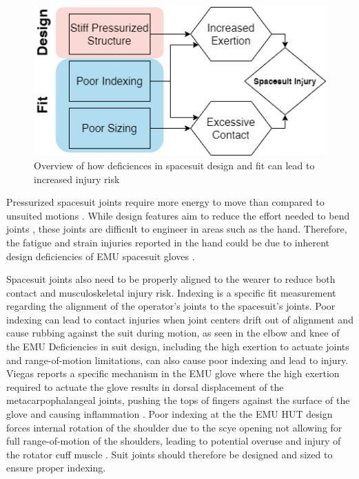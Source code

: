 \documentclass[defaultstyle,11pt]{comps}
\begin{document}
\begin{figure}
\hypertarget{fig:B-fitflow}{%
\centering
\includegraphics{../fig/Background/fitflow.PNG}
\caption{Overview of how deficiences in spacesuit design and fit can lead to increased injury risk}\label{fig:B-fitflow}
}
\end{figure}

Pressurized spacesuit joints require more energy to move than compared to unsuited motions \citep{Newman1997, Amick2015}.
While design features aim to reduce the effort needed to bend joints \citep{Harris2001}, these joints are difficult to engineer in areas such as the hand.
Therefore, the fatigue and strain injuries reported in the hand could be due to inherent design deficiencies of EMU spacesuit gloves \citep{Strauss2004, Viegas2004}.

Spacesuit joints also need to be properly aligned to the wearer to reduce both contact and musculoskeletal injury risk.
Indexing is a specific fit measurement regarding the alignment of the operator's joints to the spacesuit's joints.
Poor indexing can lead to contact injuries when joint centers drift out of alignment and cause rubbing against the suit during motion, as seen in the elbow and knee of the EMU \citep{Strauss2004}
Deficiencies in suit design, including the high exertion to actuate joints and range-of-motion limitations, can also cause poor indexing and lead to injury.
Viegas reports a specific mechanism in the EMU glove where the high exertion required to actuate the glove results in dorsal displacement of the metacarpophalangeal joints, pushing the tops of fingers against the surface of the glove and causing inflammation \citep{Viegas2004}.
Poor indexing at the the EMU HUT design forces internal rotation of the shoulder due to the scye opening not allowing for full range-of-motion of the shoulders, leading to potential overuse and injury of the rotator cuff muscle \citep{Williams2003, Strauss2004, Strauss2005, Scheuring2012}.
Suit joints should therefore be designed and sized to ensure proper indexing.
\end{document}
